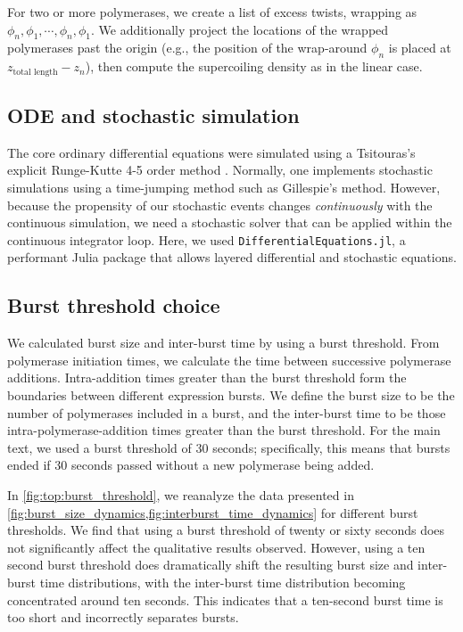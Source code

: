 \documentclass[11pt]{article}
\begin{document}
For two or more polymerases, we create a list of excess twists, wrapping as \(\phi_{n}, \phi_1, \cdots, \phi_n, \phi_1\). We additionally project the locations of the wrapped polymerases past the origin (e.g., the position of the wrap-around \(\phi_n\) is placed at \(z_\text{total length} - z_n\)), then compute the supercoiling density as in the linear case.

\subsection{ODE and stochastic simulation}
The core ordinary differential equations were simulated using a Tsitouras's explicit Runge-Kutte 4-5 order method \parencite{tsitourasRungeKuttaPairs2011}.
Normally, one implements stochastic simulations using a time-jumping method such as Gillespie's method. However, because the propensity of our stochastic events changes \emph{continuously} with the continuous simulation, we need a stochastic solver that can be applied within the continuous integrator loop. Here, we used \texttt{DifferentialEquations.jl}, a performant Julia package that allows layered differential and stochastic equations.
\parencite{rackauckasDifferentialEquationsJlPerformant2017}

\subsection{Burst threshold choice} \label{sec:supp:burst_threshold}
We calculated burst size and inter-burst time by using a burst threshold. From polymerase initiation times, we calculate the time between successive polymerase additions. Intra-addition times greater than the burst threshold form the boundaries between different expression bursts. We define the burst size to be the number of polymerases included in a burst, and the inter-burst time to be those intra-polymerase-addition times greater than the burst threshold. For the main text, we used a burst threshold of 30 seconds; specifically, this means that bursts ended if 30 seconds passed without a new polymerase being added.

In \cref{fig:top:burst_threshold}, we reanalyze the data presented in \cref{fig:burst_size_dynamics,fig:interburst_time_dynamics} for different burst thresholds. We find that using a burst threshold of twenty or sixty seconds does not significantly affect the qualitative results observed. However, using a ten second burst threshold does dramatically shift the resulting burst size and inter-burst time distributions, with the inter-burst time distribution becoming concentrated around ten seconds. This indicates that a ten-second burst time is too short and incorrectly separates bursts.
\end{document}

